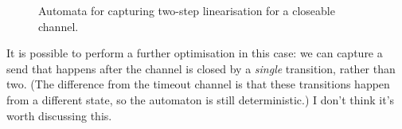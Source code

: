 
\begin{figure}
\begin{center}
\end{center}
\caption{Automata for capturing two-step linearisation for a closeable channel.}
\label{fig:two-step-closeable-chan}
\end{figure}




It is possible to perform a further optimisation in this case: we can capture
a send that happens after the channel is closed by a \emph{single} transition,
rather than two.  (The difference from the timeout channel is that these
transitions happen from a different state, so the automaton is still
deterministic.)  \framebox{***} I don't think it's worth discussing this.

